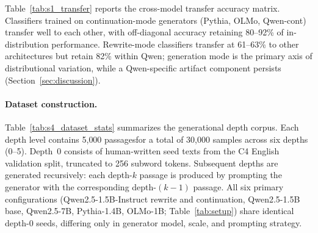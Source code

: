Table~\ref{tab:s1_transfer} reports the cross-model transfer accuracy matrix.
Classifiers trained on continuation-mode generators (Pythia, OLMo, Qwen-cont) transfer well to each other, with off-diagonal accuracy retaining 80--92\% of in-distribution performance.
Rewrite-mode classifiers transfer at 61--63\% to other architectures but retain 82\% within Qwen; generation mode is the primary axis of distributional variation, while a Qwen-specific artifact component persists (Section~\ref{sec:discussion}).

\begin{table}[!htbp]
  \centering
  \small
  \caption{Cross-model transfer accuracy matrix. Diagonal (\textbf{bold}): within-model; off-diagonal: cross-model. Retention: Pythia$\leftrightarrow$OLMo 89--92\%, Qwen-cont$\leftrightarrow$Pythia 84--85\%, Qwen-rw$\to$Pythia/OLMo 61--63\%, Qwen-rw$\to$Qwen-cont 82\%.}
  \label{tab:s1_transfer}
\end{table}

\paragraph{Dataset construction.}
Table~\ref{tab:s4_dataset_stats} summarizes the generational depth corpus.
Each depth level contains 5{,}000 passagesfor a total of 30{,}000 samples across six depths (0--5).
Depth~0 consists of human-written seed texts from the C4 English validation split, truncated to 256 subword tokens.
Subsequent depths are generated recursively: each depth-$k$ passage is produced by prompting the generator with the corresponding depth-$(k{-}1)$ passage.
All six primary configurations (Qwen2.5-1.5B-Instruct rewrite and continuation, Qwen2.5-1.5B base, Qwen2.5-7B, Pythia-1.4B, OLMo-1B; Table~\ref{tab:setup}) share identical depth-0 seeds, differing only in generator model, scale, and prompting strategy.

